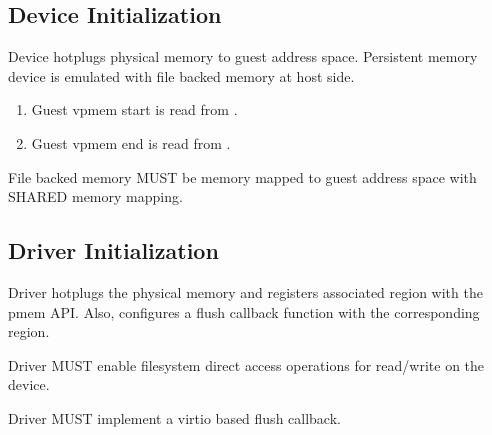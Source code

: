 \subsection{Device Initialization}\label{sec:Device Types / PMEM Device / Device Initialization}

Device hotplugs physical memory to guest address space. Persistent memory device
is emulated with file backed memory at host side.

\begin{enumerate}
\item Guest vpmem start is read from .
\item Guest vpmem end is read from .
\end{enumerate}


File backed memory MUST be memory mapped to guest address space with SHARED
memory mapping.

\subsection{Driver Initialization}\label{sec:Device Types / PMEM Driver / Driver Initialization}

Driver hotplugs the physical memory and registers associated region with the pmem API.
Also, configures a flush callback function with the corresponding region.


Driver MUST enable filesystem direct access operations for read/write on the device.


Driver MUST implement a virtio based flush callback.

